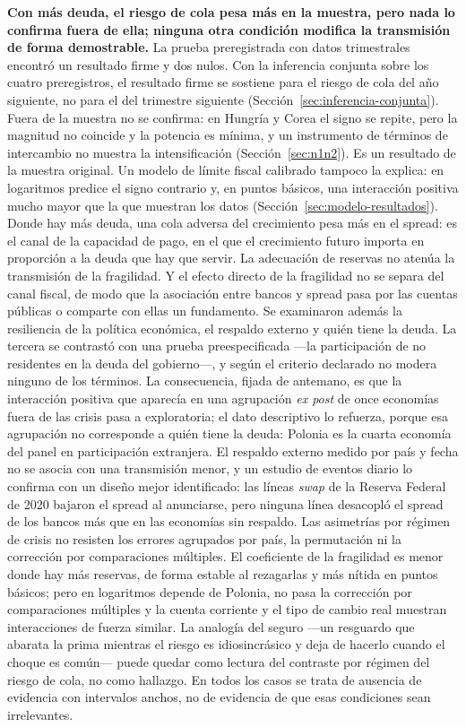 \textbf{Con más deuda, el riesgo de cola pesa más en la muestra, pero nada lo confirma fuera de ella; ninguna otra condición modifica la transmisión de forma demostrable.} La prueba preregistrada con datos trimestrales encontró un resultado firme y dos nulos. Con la inferencia conjunta sobre los cuatro preregistros, el resultado firme se sostiene para el riesgo de cola del año siguiente, no para el del trimestre siguiente (Sección~\ref{sec:inferencia-conjunta}). Fuera de la muestra no se confirma: en Hungría y Corea el signo se repite, pero la magnitud no coincide y la potencia es mínima, y un instrumento de términos de intercambio no muestra la intensificación (Sección~\ref{sec:n1n2}). Es un resultado de la muestra original. Un modelo de límite fiscal calibrado tampoco la explica: en logaritmos predice el signo contrario y, en puntos básicos, una interacción positiva mucho mayor que la que muestran los datos (Sección~\ref{sec:modelo-resultados}). Donde hay más deuda, una cola adversa del crecimiento pesa más en el spread: es el canal de la capacidad de pago, en el que el crecimiento futuro importa en proporción a la deuda que hay que servir. La adecuación de reservas no atenúa la transmisión de la fragilidad. Y el efecto directo de la fragilidad no se separa del canal fiscal, de modo que la asociación entre bancos y spread pasa por las cuentas públicas o comparte con ellas un fundamento. Se examinaron además la resiliencia de la política económica, el respaldo externo y quién tiene la deuda. La tercera se contrastó con una prueba preespecificada ---la participación de no residentes en la deuda del gobierno---, y según el criterio declarado no modera ninguno de los términos. La consecuencia, fijada de antemano, es que la interacción positiva que aparecía en una agrupación \textit{ex post} de once economías fuera de las crisis pasa a exploratoria; el dato descriptivo lo refuerza, porque esa agrupación no corresponde a quién tiene la deuda: Polonia es la cuarta economía del panel en participación extranjera. El respaldo externo medido por país y fecha no se asocia con una transmisión menor, y un estudio de eventos diario lo confirma con un diseño mejor identificado: las líneas \textit{swap} de la Reserva Federal de 2020 bajaron el spread al anunciarse, pero ninguna línea desacopló el spread de los bancos más que en las economías sin respaldo. Las asimetrías por régimen de crisis no resisten los errores agrupados por país, la permutación ni la corrección por comparaciones múltiples. El coeficiente de la fragilidad es menor donde hay más reservas, de forma estable al rezagarlas y más nítida en puntos básicos; pero en logaritmos depende de Polonia, no pasa la corrección por comparaciones múltiples y la cuenta corriente y el tipo de cambio real muestran interacciones de fuerza similar. La analogía del seguro ---un resguardo que abarata la prima mientras el riesgo es idiosincrásico y deja de hacerlo cuando el choque es común--- puede quedar como lectura del contraste por régimen del riesgo de cola, no como hallazgo. En todos los casos se trata de ausencia de evidencia con intervalos anchos, no de evidencia de que esas condiciones sean irrelevantes.

